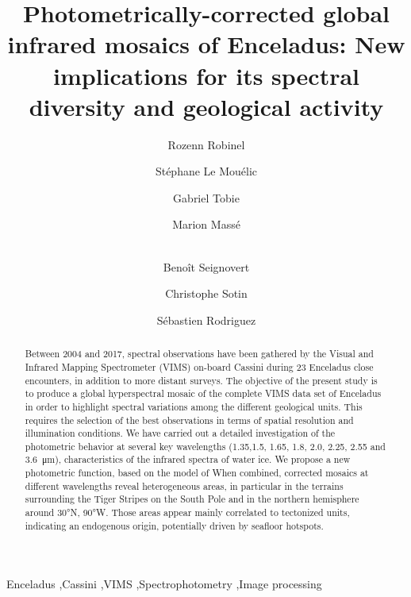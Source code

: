 \documentclass{arxiv-icarus}
\begin{document}
\begin{frontmatter}
\title{Photometrically-corrected global infrared mosaics of Enceladus: New implications for its spectral diversity and geological activity}

\author[LPG]{Rozenn Robinel}
\author[LPG]{St\'{e}phane Le Mou\'{e}lic}
\author[LPG]{Gabriel Tobie}
\author[LPG]{Marion Mass\'{e}}
\author[JPL]{\\Beno\^{i}t Seignovert}
\author[JPL]{Christophe Sotin}
\author[IPG]{S\'{e}bastien Rodriguez}

\address[LPG]{Laboratoire de Plan\'{e}tologie et G\'{e}odynamique, UMR 6112, CNRS, Universit\'{e} de Nantes, 2 chemin de la Houssini\`{e}re, 44300 Nantes, Franc}
\address[JPL]{Jet Propulsion Laboratory, California Institute of Technology, Pasadena, CA 91109, USA}
\address[IPG]{Universit\'{w} de Paris, Institut de Physique du Globe de Paris, CNRS, Paris, France}

\begin{abstract}
Between 2004 and 2017, spectral observations have been gathered by the Visual and Infrared Mapping Spectrometer (VIMS) on-board Cassini \citep{Brown2004} during 23 Enceladus close encounters, in addition to more distant surveys. The objective of the present study is to produce a global hyperspectral mosaic of the complete VIMS data set of Enceladus in order to highlight spectral variations among the different geological units. This requires the selection of the best observations in terms of spatial resolution and illumination conditions. We have carried out a detailed investigation of the photometric behavior at several key wavelengths (\num{1.35},\num{1.5}, \num{1.65}, \num{1.8}, \num{2.0}, \num{2.25}, \num{2.55} and \SI{3.6}{\um}), characteristics of the infrared spectra of water ice. We propose a new photometric function, based on the model of \cite{Shkuratov2011} When combined, corrected mosaics at different wavelengths reveal heterogeneous areas, in particular in the terrains surrounding the Tiger Stripes on the South Pole and in the northern hemisphere around \ang{30}N, \ang{90}W. Those areas appear mainly correlated to tectonized units, indicating an endogenous origin, potentially driven by seafloor hotspots.
\end{abstract}

\begin{keyword}
Enceladus \sep Cassini \sep VIMS \sep Spectrophotometry \sep Image processing
\end{keyword}

\end{frontmatter}
\end{document}
